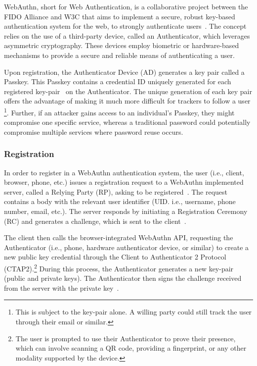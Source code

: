 
\newcommand{\credIdentifier}{\footnote{There is a requirement to check whether the credential identifier, generated by the Authenticator
device exsits on the server.
For further discussions on this topic, see section \hyperref[sec:futurework]{Future work}}}

\newcommand{\navigatorApi}{\footnote{In LessPM's case, this is the \textit{navigator.credentials} API provided by the browser.}}


WebAuthn, short for Web Authentication, is a collaborative project between the FIDO Alliance and W3C that aims to
implement a secure, robust key-based authentication system for the web, to strongly authenticate users~\cite{webauthn_level_2}.
The concept relies on the use of a third-party device, called an Authenticator, which leverages asymmetric cryptography.
These devices employ biometric or hardware-based mechanisms to provide a secure and reliable means of authenticating a
user.

Upon registration, the Authenticator Device (AD) generates a key pair called a
Passkey.
This Passkey contains a credential ID uniquely generated for each registered key-pair~\cite{webauthn_credential_id,webauthn_public_key_credential}
on the Authenticator.
The unique generation of each key pair offers the advantage of making it much more difficult for trackers to follow a user
\footnote{This is subject to the key-pair alone. A willing party could still track the user through their email or similar.}.
Further, if an attacker gains access to an individual's Passkey, they might compromise one specific service, whereas
a traditional password could potentially compromise multiple services where password reuse occurs\cite{wang2018next}.

\subsubsection{Registration}\label{subsubsec:registration}
In order to register in a WebAuthn authentication system, the user (i.e., client, browser, phone, etc.) issues a registration request to a
WebAuthn implemented server, called a Relying Party (RP), asking to be
registered~\cite{webauthn-2-rp}.
The request contains a body with the relevant user identifier (UID. i.e.,
username, phone number, email, etc.).
The server responds by initiating a Registration Ceremony (RC) and generates a
challenge, which is sent to the client~\cite{webauthn-2}.

The client then calls the browser-integrated WebAuthn API, requesting the
Authenticator (i.e., phone, hardware authenticator device, or similar)
to create a new public key credential through the Client to Authenticator 2
Protocol (CTAP2).\footnote{
  The user is prompted to use their Authenticator to prove their presence, which can involve scanning a QR code,
  providing a fingerprint, or any other modality supported by the device.}
During this process, the Authenticator generates a new key-pair (public and
private keys).
The Authenticator then signs the challenge received from the server with the
private key~\cite{webauthn-2-registering}.

